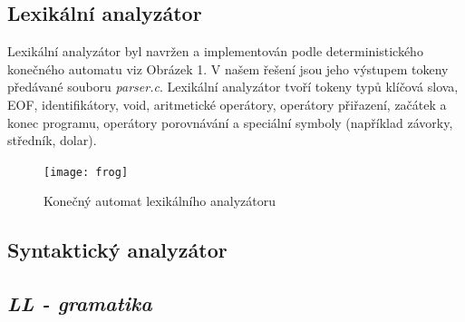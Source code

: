 \documentclass{article}
\begin{document}
\subsection{Lexikální analyzátor}

Lexikální analyzátor byl navržen a implementován podle deterministického konečného automatu viz Obrázek 1. V našem řešení jsou jeho výstupem tokeny předávané souboru \emph{parser.c}. Lexikální analyzátor tvoří tokeny typů klíčová slova, EOF, identifikátory, void, aritmetické operátory, operátory přiřazení, začátek a konec programu, operátory porovnávání a speciální symboly (například závorky, středník, dolar).

\begin{figure}[h]
    \centering
    \texttt{[image: frog]}
    \caption{Konečný automat lexikálního analyzátoru}
    \label{fig:mesh1}
\end{figure}

\subsection{Syntaktický analyzátor}

\subsection{\emph{LL - gramatika}}
\end{document}
